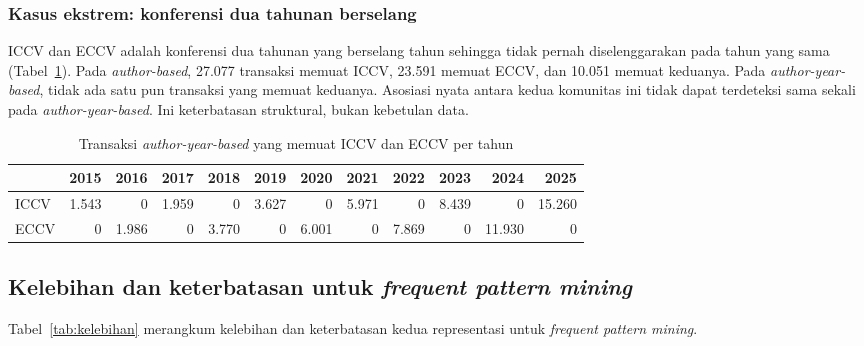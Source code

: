 \subsubsection{Kasus ekstrem: konferensi dua tahunan berselang}
ICCV dan ECCV adalah konferensi dua tahunan yang berselang tahun sehingga tidak pernah diselenggarakan pada tahun yang sama (Tabel~\ref{tab:iccv}). Pada \textit{author-based}, 27.077 transaksi memuat ICCV, 23.591 memuat ECCV, dan 10.051 memuat keduanya. Pada \textit{author-year-based}, tidak ada satu pun transaksi yang memuat keduanya. Asosiasi nyata antara kedua komunitas ini tidak dapat terdeteksi sama sekali pada \textit{author-year-based}. Ini keterbatasan struktural, bukan kebetulan data.

\begin{table}[ht]
\caption{Transaksi \textit{author-year-based} yang memuat ICCV dan ECCV per tahun}
\label{tab:iccv}
\footnotesize
\setlength{\tabcolsep}{3.5pt}
\begin{tabular}{@{}lrrrrrrrrrrr@{}}
\toprule
 & \textbf{2015} & \textbf{2016} & \textbf{2017} & \textbf{2018} & \textbf{2019} & \textbf{2020} & \textbf{2021} & \textbf{2022} & \textbf{2023} & \textbf{2024} & \textbf{2025} \\
\midrule
ICCV & 1.543 & 0 & 1.959 & 0 & 3.627 & 0 & 5.971 & 0 & 8.439 & 0 & 15.260 \\
ECCV & 0 & 1.986 & 0 & 3.770 & 0 & 6.001 & 0 & 7.869 & 0 & 11.930 & 0 \\
\bottomrule
\end{tabular}
\end{table}

\subsection{Kelebihan dan keterbatasan untuk \textit{frequent pattern mining}}
\label{sec:hasil-kelebihan}
Tabel~\ref{tab:kelebihan} merangkum kelebihan dan keterbatasan kedua representasi untuk \textit{frequent pattern mining}.

